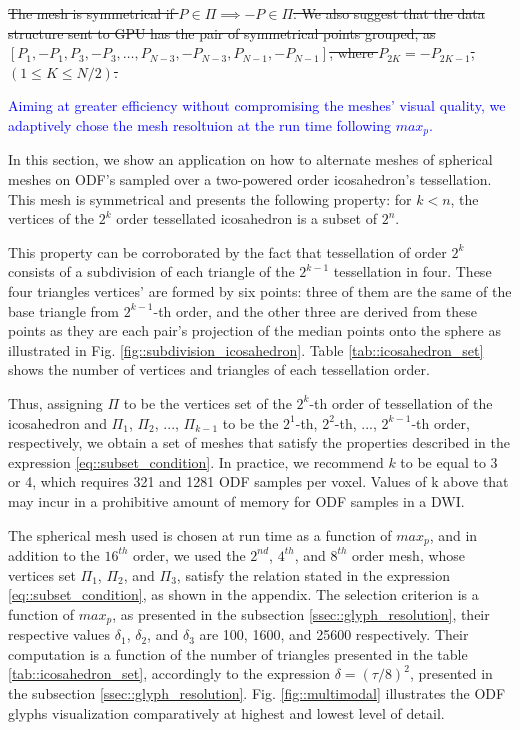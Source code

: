 \documentclass[twoside,twocolumn,10pt]{article}
\begin{document}
\sout{The mesh is symmetrical if $P \in \Pi \implies -P \in \Pi$. We also suggest that the data structure sent to GPU has the pair of symmetrical points grouped, as $[P_1, -P_1, P_3, -P_3, \dots, P_{N-3}, -P_{N-3}, P_{N-1}, -P_{N-1}]$, where $P_{2K} = -P_{2K-1}$, $(1 \leq K \leq N/2)$.}

\textcolor{blue}{Aiming at greater efficiency without compromising the meshes' visual quality, we adaptively chose the mesh resoltuion at the run time following $max_p$.}


In this section, we show an application on how to alternate meshes of spherical meshes on ODF's sampled over a two-powered order icosahedron's tessellation. This mesh is symmetrical and presents the following property: for $k < n$, the vertices of the $2^{k}$ order tessellated icosahedron is a subset of $2^{n}$.

This property can be corroborated by the fact that tessellation of order $2^k$ consists of a subdivision of each triangle of the $2^{k-1}$ tessellation in four. These four triangles vertices' are formed by six points: three of them are the same of the base triangle from $2^{k-1}$-th order, and the other three are derived from these points as they are each pair's projection of the median points onto the sphere as illustrated in Fig. \ref{fig::subdivision_icosahedron}. Table \ref{tab::icosahedron_set} shows the number of vertices and triangles of each tessellation order.

Thus, assigning $\Pi$ to be the vertices set of the $2^k$-th order of tessellation of the icosahedron and $\Pi_1$, $\Pi_2$, ..., $\Pi_{k-1}$ to be the $2^{1}$-th, $2^{2}$-th, ..., $2^{k-1}$-th order, respectively, we obtain a set of meshes that satisfy the properties described in the expression \ref{eq::subset_condition}. In practice, we recommend $k$ to be equal to 3 or 4, which requires 321 and 1281 ODF samples per voxel. Values of k above that may incur in a prohibitive amount of memory for ODF samples in a DWI.

The spherical mesh used is chosen at run time as a function of $max_p$, and in addition to the $16^{th}$ order,  we used the $2^{nd}$, $4^{th}$, and $8^{th}$ order mesh, whose vertices set $\Pi_1$, $\Pi_2$, and $\Pi_3$, satisfy the relation stated in the expression \ref{eq::subset_condition}, as shown in the appendix. The selection criterion is a function of $max_p$, as presented in the subsection \ref{ssec::glyph_resolution}, their respective values $\delta_1$, $\delta_2$, and $\delta_3$ are 100, 1600, and 25600 respectively. Their computation is a function of the number of triangles presented in the table \ref{tab::icosahedron_set}, accordingly to the expression $\delta = (\tau/8)^2$, presented in the subsection \ref{ssec::glyph_resolution}. Fig. \ref{fig::multimodal} illustrates the ODF glyphs visualization comparatively at highest and lowest level of detail.
\end{document}
